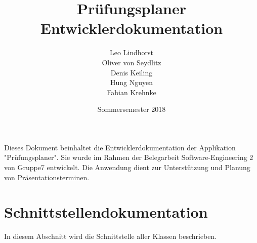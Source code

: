 \documentclass[a4paper,10pt]{scrartcl}
\begin{document}
	\title{Prüfungsplaner \\ Entwicklerdokumentation}
	\author{Leo Lindhorst\\
		Oliver von Seydlitz\\
		Denis Keiling\\
		Hung Nguyen\\
		Fabian Krehnke}
	\date{Sommersemester 2018}
	\maketitle

	Dieses Dokument beinhaltet die Entwicklerdokumentation der Applikation "Prüfungsplaner". Sie wurde im Rahmen der Belegarbeit Software-Engineering 2 von Gruppe7 entwickelt. Die Anwendung dient zur Unterstützung und Planung von Präsentationsterminen.
	\newpage

	\tableofcontents
	\newpage

	\listoffigures
	\newpage

  
	\newpage

	
	\newpage

	
	\newpage

  
	\newpage

	\section{Schnittstellendokumentation}
	In diesem Abschnitt wird die Schnittstelle aller Klassen beschrieben.
  
\end{document}
